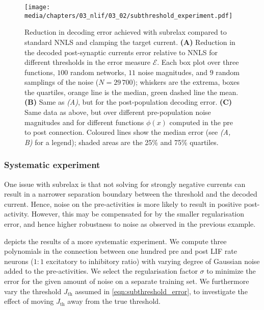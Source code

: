 \begin{figure}[t]
	\texttt{[image: media/chapters/03\_nlif/03\_02/subthreshold\_experiment.pdf]}%
	{\label{fig:subthreshold_experiment_a}}%
	{\label{fig:subthreshold_experiment_b}}%
	{\label{fig:subthreshold_experiment_c}}%
	\caption[Reduction in decoding error achieved with subthreshold relaxation]{Reduction in decoding error achieved with \gls{subrelax} compared to standard NNLS and clamping the target current.
	\textbf{(A)} Reduction in the decoded post-synaptic currents error relative to NNLS for different thresholds in the error measure $\mathcal{E}$.
	Each box plot over three functions, $100$ random networks, $11$ noise magnitudes, and $9$ random samplings of the noise ($N = 29\,700$); whiskers are the extrema, boxes the quartiles, orange line is the median, green dashed line the mean.
	\textbf{(B)}
	Same as \emph{(A)}, but for the post-population decoding error.
	\textbf{(C)} Same data as above, but over different pre-population noise magnitudes and for different functions $\phi(x)$ computed in the pre to post connection.
	Coloured lines show the median error (see \emph{(A, B)} for a legend); shaded areas are the 25\% and 75\% quartiles.
	}
	\label{fig:subthreshold_experiment}
\end{figure}

\subsubsection{Systematic experiment}
One issue with \gls{subrelax} is that not solving for strongly negative currents can result in a narrower separation boundary between the threshold and the decoded current.
Hence, noise on the pre-activities is more likely to result in positive post-activity.
However, this may be compensated for by the smaller regularisation error, and hence higher robustness to noise as observed in the previous example.

 depicts the results of a more systematic experiment.
We compute three polynomials in the connection between one hundred pre and post LIF rate neurons ($1\!\!:\!\!1$ excitatory to inhibitory ratio) with varying degree of Gaussian noise added to the pre-activities.
We select the regularisation factor $\sigma$ to minimize the error for the given amount of noise on a separate training set.
We furthermore vary the threshold $J_\mathrm{th}$ assumed in \cref{eqn:subthreshold_error}, to investigate the effect of moving $J_\mathrm{th}$ away from the true threshold.


